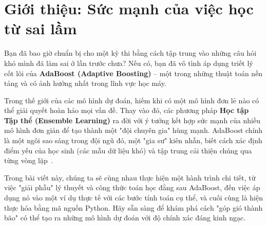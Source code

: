 \section{Giới thiệu: Sức mạnh của việc học từ sai lầm}
Bạn đã bao giờ chuẩn bị cho một kỳ thi bằng cách tập trung vào những câu hỏi khó mình đã làm sai ở lần trước chưa? Nếu có, bạn đã vô tình áp dụng triết lý cốt lõi của \textbf{AdaBoost (Adaptive Boosting)} -- một trong những thuật toán nền tảng và có ảnh hưởng nhất trong lĩnh vực học máy.

Trong thế giới của các mô hình dự đoán, hiếm khi có một mô hình đơn lẻ nào có thể giải quyết hoàn hảo mọi vấn đề. Thay vào đó, các phương pháp \textbf{Học tập Tập thể (Ensemble Learning)} ra đời với ý tưởng kết hợp sức mạnh của nhiều mô hình đơn giản để tạo thành một "đội chuyên gia" hùng mạnh. AdaBoost chính là một ngôi sao sáng trong đội ngũ đó, một "gia sư" kiên nhẫn, biết cách xác định điểm yếu của học sinh (các mẫu dữ liệu khó) và tập trung cải thiện chúng qua từng vòng lặp~\cite{freund1997decision}.

Trong bài viết này, chúng ta sẽ cùng nhau thực hiện một hành trình chi tiết, từ việc "giải phẫu" lý thuyết và công thức toán học đằng sau AdaBoost, đến việc áp dụng nó vào một ví dụ thực tế với các bước tính toán cụ thể, và cuối cùng là hiện thực hóa bằng mã nguồn Python. Hãy sẵn sàng để khám phá cách "góp gió thành bão" có thể tạo ra những mô hình dự đoán với độ chính xác đáng kinh ngạc.

